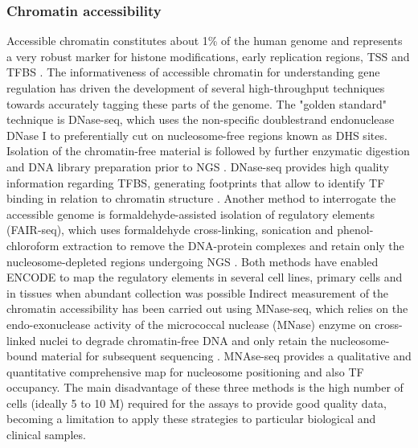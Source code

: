 \subsubsection{Chromatin accessibility}

Accessible chromatin constitutes about 1\% of the human genome and represents a very robust marker for histone modifications, early replication regions, TSS and TFBS \parencite{ENCODE2007}. The informativeness of accessible chromatin for understanding gene regulation has driven the development of several high-throughput techniques towards accurately tagging these parts of the genome. The "golden standard" technique is DNase-seq, which uses the non-specific doublestrand endonuclease DNase I to preferentially cut on nucleosome-free regions known as DHS sites. Isolation of the chromatin-free material is followed by further enzymatic digestion and DNA library preparation prior to NGS \parencite{John2013}. DNase-seq provides high quality information regarding TFBS, generating footprints that allow to identify TF binding in relation to chromatin structure \parencite{Hesselberth2009,Boyle2010}. Another method to interrogate the accessible genome is formaldehyde-assisted isolation of regulatory elements (FAIR-seq), which uses formaldehyde cross-linking, sonication and phenol-chloroform extraction to remove the DNA-protein complexes and retain only the nucleosome-depleted regions undergoing NGS \parencite{Giresi2006}. Both methods have enabled ENCODE to map the regulatory elements in several cell lines, primary cells and in tissues when abundant collection was possible \parencite{ENCODE2007,Buck2014,Gaulton2010}Indirect measurement of the chromatin accessibility has been carried out using MNase-seq, which relies on the endo-exonuclease activity of the micrococcal nuclease (MNase) enzyme on cross-linked nuclei to degrade chromatin-free DNA and only retain the nucleosome-bound material for subsequent sequencing \parencite{Axel1975,Ponts2010}. MNAse-seq provides a qualitative and quantitative comprehensive map for nucleosome positioning and also TF occupancy. The main disadvantage of these three methods is the high number of cells (ideally 5 to 10 M) required for the assays to provide good quality data, becoming a limitation to apply these strategies to particular biological and clinical samples. 

